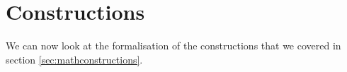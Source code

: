 \section{Constructions}

We can now look at the formalisation of the constructions that we covered in section \ref{sec:mathconstructions}.





